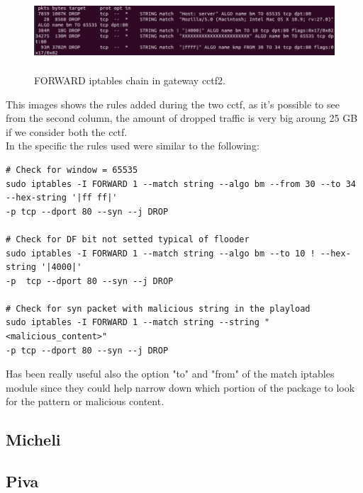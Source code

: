 \documentclass[14pt]{article}
\begin{document}
\begin{figure}[!h]
	\centering
	\includegraphics[width=20cm,height=3cm]{iptables_cctf_2}
	\caption{FORWARD iptables chain in gateway cctf2.}
\end{figure}
This images shows the rules added during the two cctf, as it's possible to see from the second column, the amount of dropped traffic is very big aroung 25 GB if we consider both the cctf. 
\\
In the specific the rules used were similar to the following:
\begin{Verbatim}
# Check for window = 65535
sudo iptables -I FORWARD 1 --match string --algo bm --from 30 --to 34 --hex-string '|ff ff|' 
-p tcp --dport 80 --syn --j DROP 

# Check for DF bit not setted typical of flooder
sudo iptables -I FORWARD 1 --match string --algo bm --to 10 ! --hex-string '|4000|' 
-p  tcp --dport 80 --syn --j DROP 

# Check for syn packet with malicious string in the playload
sudo iptables -I FORWARD 1 --match string --string "<malicious_content>" 
-p tcp --dport 80 --syn --j DROP
\end{Verbatim}

Has been really useful also the option "to" and "from" of the match iptables module since 
they could help narrow down which portion of the package to look for the pattern or malicious content.

\subsection{Micheli}

\subsection{Piva}
\end{document}
